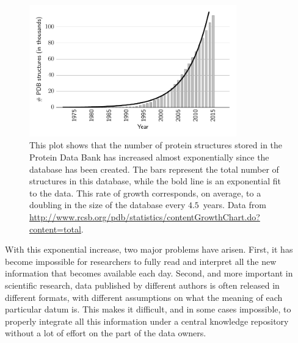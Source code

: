 \begin{figure}
    \centering
    \includegraphics[width=0.8\textwidth]{images/pdb-stats.pdf}
    \caption[Number of $3$-dimensional protein structures in PDB from 1975 to~2015]{This plot shows that the number of protein structures stored in the Protein Data Bank has increased almost exponentially since the database has been created. The bars represent the total number of structures in this database, while the bold line is an exponential fit to the data. This rate of growth corresponds, on average, to a doubling in the size of the database every $4.5$~years. Data from \url{http://www.rcsb.org/pdb/statistics/contentGrowthChart.do?content=total}.}
    \label{fig:pdb-growth}
\end{figure}

   
With this exponential increase, two major problems have arisen. First, it has become impossible for researchers to fully read and interpret all the new information that becomes available each day. Second, and more important in scientific research, data published by different authors is often released in different formats, with different assumptions on what the meaning of each particular datum is. This makes it difficult, and in some cases impossible, to properly integrate all this information under a central knowledge repository without a lot of effort on the part of the data owners.

